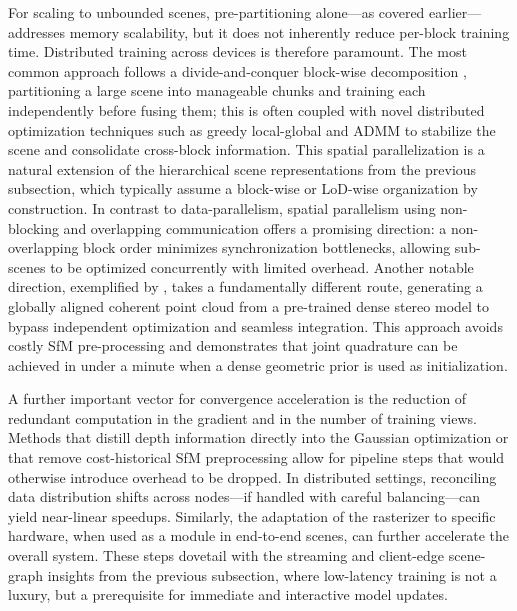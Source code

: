 \documentclass[11pt,a4paper]{article}
\begin{document}
For scaling to unbounded scenes, pre-partitioning alone---as covered earlier---addresses memory scalability, but it does not inherently reduce per-block training time. Distributed training across devices is therefore paramount. The most common approach follows a divide-and-conquer block-wise decomposition \cite{arxiv:2403.20309v1}, partitioning a large scene into manageable chunks and training each independently before fusing them; this is often coupled with novel distributed optimization techniques such as greedy local-global and ADMM to stabilize the scene and consolidate cross-block information. This spatial parallelization is a natural extension of the hierarchical scene representations from the previous subsection, which typically assume a block-wise or LoD-wise organization by construction. In contrast to data-parallelism, spatial parallelism using non-blocking and overlapping communication offers a promising direction: a non-overlapping block order minimizes synchronization bottlenecks, allowing sub-scenes to be optimized concurrently with limited overhead. Another notable direction, exemplified by \cite{arxiv:2403.20309v1}, takes a fundamentally different route, generating a globally aligned coherent point cloud from a pre-trained dense stereo model to bypass independent optimization and seamless integration. This approach avoids costly SfM pre-processing and demonstrates that joint quadrature can be achieved in under a minute when a dense geometric prior is used as initialization.

A further important vector for convergence acceleration is the reduction of redundant computation in the gradient and in the number of training views. Methods that distill depth information directly into the Gaussian optimization or that remove cost-historical SfM preprocessing allow for pipeline steps that would otherwise introduce overhead to be dropped. In distributed settings, reconciling data distribution shifts across nodes---if handled with careful balancing---can yield near-linear speedups. Similarly, the adaptation of the rasterizer to specific hardware, when used as a module in end-to-end scenes, can further accelerate the overall system. These steps dovetail with the streaming and client-edge scene-graph insights from the previous subsection, where low-latency training is not a luxury, but a prerequisite for immediate and interactive model updates.
\end{document}
